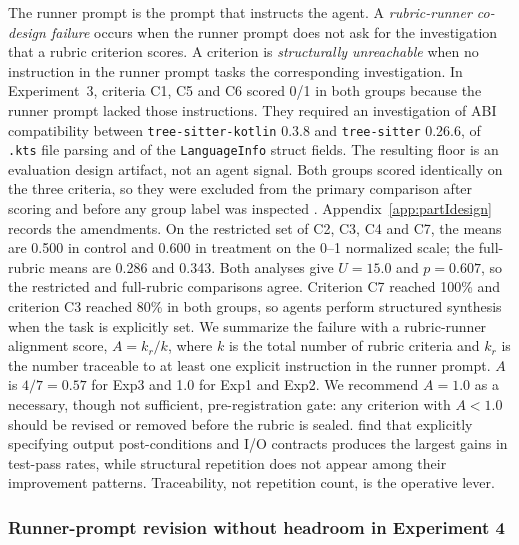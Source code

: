 \documentclass[11pt,a4paper]{article}
\begin{document}
The runner prompt is the prompt that instructs the agent.
A \emph{rubric-runner co-design failure} occurs when the runner prompt does not ask for the investigation that a rubric criterion scores.
A criterion is \emph{structurally unreachable} when no instruction in the runner prompt tasks the corresponding investigation.
In Experiment~3, criteria C1, C5 and C6 scored 0/1 in both groups because the runner prompt lacked those instructions.
They required an investigation of ABI compatibility between \texttt{tree-sitter-kotlin} 0.3.8 and \texttt{tree-sitter} 0.26.6, of \texttt{.kts} file parsing and of the \texttt{LanguageInfo} struct fields.
The resulting floor is an evaluation design artifact, not an agent signal.
Both groups scored identically on the three criteria, so they were excluded from the primary comparison after scoring and before any group label was inspected \citep{ernst2023registered}.
Appendix~\ref{app:partIdesign} records the amendments.
On the restricted set of C2, C3, C4 and C7, the means are 0.500 in control and 0.600 in treatment on the 0--1 normalized scale; the full-rubric means are 0.286 and 0.343.
Both analyses give $U{=}15.0$ and $p{=}0.607$, so the restricted and full-rubric comparisons agree.
Criterion C7 reached 100\% and criterion C3 reached 80\% in both groups, so agents perform structured synthesis when the task is explicitly set.
We summarize the failure with a rubric-runner alignment score, $A = k_r / k$, where $k$ is the total number of rubric criteria and $k_r$ is the number traceable to at least one explicit instruction in the runner prompt.
$A$ is $4/7 = 0.57$ for Exp3 and 1.0 for Exp1 and Exp2.
We recommend $A{=}1.0$ as a necessary, though not sufficient, pre-registration gate: any criterion with $A{<}1.0$ should be revised or removed before the rubric is sealed.
\citet{midolo2026guidelines} find that explicitly specifying output post-conditions and I/O contracts produces the largest gains in test-pass rates, while structural repetition does not appear among their improvement patterns.
Traceability, not repetition count, is the operative lever.

\subsubsection{Runner-prompt revision without headroom in Experiment 4}
\label{subsec:exp4results}
\end{document}
